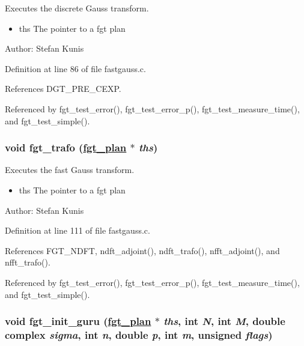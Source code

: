 Executes the discrete Gauss transform. 

\begin{itemize}
\item ths The pointer to a fgt plan\end{itemize}
\begin{Desc}
\item[Author:]Stefan Kunis \end{Desc}


Definition at line 86 of file fastgauss.c.

References DGT\_\-PRE\_\-CEXP.

Referenced by fgt\_\-test\_\-error(), fgt\_\-test\_\-error\_\-p(), fgt\_\-test\_\-measure\_\-time(), and fgt\_\-test\_\-simple().\hypertarget{group__applications__fastgauss_ga1}{
\subsubsection[fgt\_\-trafo]{\setlength{\rightskip}{0pt plus 5cm}void fgt\_\-trafo (\hyperlink{structfgt__plan}{fgt\_\-plan} $\ast$ {\em ths})}}
\label{group__applications__fastgauss_ga1}


Executes the fast Gauss transform. 

\begin{itemize}
\item ths The pointer to a fgt plan\end{itemize}
\begin{Desc}
\item[Author:]Stefan Kunis \end{Desc}


Definition at line 111 of file fastgauss.c.

References FGT\_\-NDFT, ndft\_\-adjoint(), ndft\_\-trafo(), nfft\_\-adjoint(), and nfft\_\-trafo().

Referenced by fgt\_\-test\_\-error(), fgt\_\-test\_\-error\_\-p(), fgt\_\-test\_\-measure\_\-time(), and fgt\_\-test\_\-simple().\hypertarget{group__applications__fastgauss_ga2}{
\subsubsection[fgt\_\-init\_\-guru]{\setlength{\rightskip}{0pt plus 5cm}void fgt\_\-init\_\-guru (\hyperlink{structfgt__plan}{fgt\_\-plan} $\ast$ {\em ths}, int {\em N}, int {\em M}, double complex {\em sigma}, int {\em n}, double {\em p}, int {\em m}, unsigned {\em flags})}}
\label{group__applications__fastgauss_ga2}



